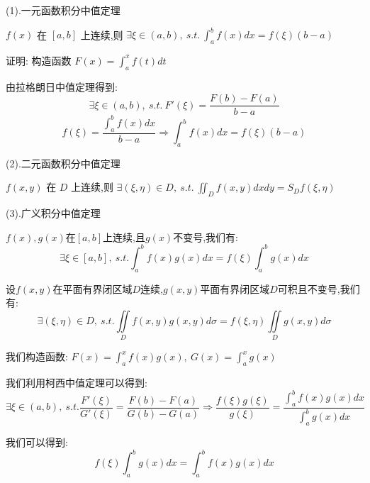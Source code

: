 \begin{theorem}[积分中值定理]

	(1).一元函数积分中值定理

	$f(x)$ 在 $[a,b]$ 上连续,则 $\exists \xi\in(a,b),\ s.t.\ \int_{a}^{b}f(x)dx=f(\xi)(b-a)$

	证明: 构造函数 $F(x)=\int_{a}^{x}f(t)dt$

	由拉格朗日中值定理得到: $$\exists \xi\in(a,b),\ s.t.\ F'(\xi)=\frac{F(b)-F(a)}{b-a}$$
	$$f(\xi)=\frac{\int_{a}^{b}f(x)dx}{b-a}\Rightarrow \int_{a}^{b}f(x)dx=f(\xi)(b-a)$$

	(2).二元函数积分中值定理

	$f(x,y)$ 在 $D$ 上连续,则 $\exists (\xi,\eta)\in D,\ s.t.\ \iint_{D}f(x,y)dxdy=S_{D}f(\xi,\eta)$

	(3).广义积分中值定理

	$f(x),g(x)$在$[a,b]$上连续,且$g(x)$不变号,我们有:
	$$\exists \xi\in[a,b],\ s.t. \int_{a}^{b}f(x)g(x)dx=f(\xi)\int_{a}^{b}g(x)dx$$

	设$f(x,y)$在平面有界闭区域$D$连续,$g(x,y)$平面有界闭区域$D$可积且不变号,我们有: $$\exists (\xi,\eta)\in D,\ s.t. \iint\limits_{D}f(x,y)g(x,y)d\sigma=f(\xi,\eta)\iint\limits_{D}g(x,y)d\sigma$$
	\begin{anymark}[注]
		我们构造函数: $F(x)=\int_{a}^{x}f(x)g(x),\ G(x)=\int_{a}^{x}g(x)$

		我们利用柯西中值定理可以得到:
		$$\exists \xi\in(a,b),\ s.t. \dfrac{F'(\xi)}{G'(\xi)}=\dfrac{F(b)-F(a)}{G(b)-G(a)}\Rightarrow \dfrac{f(\xi)g(\xi)}{g(\xi)}=\dfrac{\int_{a}^{b}f(x)g(x)dx}{\int_{a}^{b}g(x)dx}$$

		我们可以得到: $$f(\xi)\int_{a}^{b}g(x)dx=\int_{a}^{b}f(x)g(x)dx$$
	\end{anymark}
\end{theorem}
